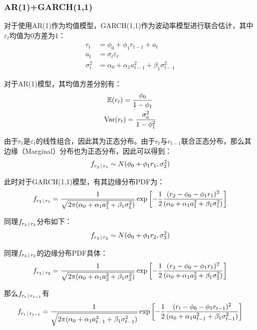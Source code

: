 \documentclass[11pt]{article}
\begin{document}
\subsubsection{AR(1)+GARCH(1,1)}

对于使用AR(1)作为均值模型，GARCH(1,1)作为波动率模型进行联合估计，其中$\varepsilon_t$均值为$0$方差为$1$：
\begin{align*}
    r_t &= \phi_0 + \phi_1 r_{t-1} + a_t \\
    a_t &= \sigma_t \varepsilon_t \\
    \sigma_t^2 &= \alpha_0 + \alpha_1 a_{t-1}^{2} + \beta_1 \sigma_{t-1}^{2}
\end{align*}

对于AR(1)模型，其均值方差分别有：
\begin{gather*}
    \mathbb{E}(r_t) = \frac{\phi_0}{1-\phi_1} \\
    \operatorname{Var}(r_t) = \frac{\sigma_{a}^2}{1-\phi_1^2}
\end{gather*}

由于$r_t$是$\varepsilon_t$的线性组合，因此其为正态分布。由于$r_t$与$r_{t-1}$联合正态分布，那么其边缘（Marginal）分布也为正态分布，因此可以得到：
\begin{equation*}
    f_{r_2 \,\vert\, r_1} \sim N(\phi_0 + \phi_1 r_1,\sigma_{2}^{2})
\end{equation*}

此时对于GARCH(1,1)模型，有其边缘分布PDF为：
\begin{equation*}
    f_{r_2 \,\vert\, r_1} = \frac{1}{\sqrt{2\pi(\alpha_0 + \alpha_1 a_{1}^{2} + \beta_1 \sigma_{1}^{2})}} \exp \left[ -\frac{1}{2} \frac{(r_2 - \phi_0 -\phi_1 r_1)^2}{(\alpha_0 + \alpha_1 a_{1}^{2} + \beta_1 \sigma_{1}^{2})} \right]
\end{equation*}

同理$f_{r_3 \,\vert\, r_2}$分布如下：
\begin{equation*}
    f_{r_3 \,\vert\, r_2} \sim N(\phi_0 + \phi_1 r_2,\sigma_{3}^{2})
\end{equation*}

同理$f_{r_3 \,\vert\, r_2}$的边缘分布PDF具体：
\begin{equation*}
    f_{r_3 \,\vert\, r_2} = \frac{1}{\sqrt{2\pi(\alpha_0 + \alpha_1 a_{2}^{2} + \beta_1 \sigma_{2}^{2})}} \exp \left[ -\frac{1}{2} \frac{(r_3 - \phi_0 -\phi_1 r_1)^2}{(\alpha_0 + \alpha_1 a_{2}^{2} + \beta_1 \sigma_{2}^{2})} \right]
\end{equation*}

那么$f_{r_{t} \,\vert\, r_{t-1}}$有
\begin{equation*}
    f_{r_{t} \,\vert\, r_{t-1}} = \frac{1}{\sqrt{2\pi(\alpha_0 + \alpha_1 a_{t-1}^{2} + \beta_1 \sigma_{t-1}^{2})}} \exp \left[ -\frac{1}{2} \frac{(r_{t} - \phi_0 -\phi_1 r_{t-1})^2}{(\alpha_0 + \alpha_1 a_{t-1}^{2} + \beta_1 \sigma_{t-1}^{2})} \right]
\end{equation*}
\end{document}
